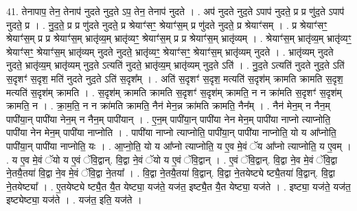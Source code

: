 \documentclass[17pt]{extarticle}
\begin{document}
41. तेनापाप॒ तेन॒ तेनाप॑ नुदते नुद॒ते ऽप॒ तेन॒ तेनाप॑ नुदते । . अप॑ नुदते नुद॒ते ऽपाप॑ नुदते॒ प्र प्र णु॑द॒ते ऽपाप॑ नुदते॒ प्र । . नु॒द॒ते॒ प्र प्र णु॑दते नुदते॒ प्र श्रेयाꣳ॑सꣳ॒॒ श्रेयाꣳ॑स॒म् प्र णु॑दते नुदते॒ प्र श्रेयाꣳ॑सम् । . प्र श्रेयाꣳ॑सꣳ॒॒ श्रेयाꣳ॑स॒म् प्र प्र श्रेयाꣳ॑स॒म् भ्रातृ॑व्य॒म् भ्रातृ॑व्यꣳ॒॒ श्रेयाꣳ॑स॒म् प्र प्र श्रेयाꣳ॑स॒म् भ्रातृ॑व्यम् । . श्रेयाꣳ॑स॒म् भ्रातृ॑व्य॒म् भ्रातृ॑व्यꣳ॒॒ श्रेयाꣳ॑सꣳ॒॒ श्रेयाꣳ॑स॒म् भ्रातृ॑व्यम् नुदते नुदते॒ भ्रातृ॑व्यꣳ॒॒ श्रेयाꣳ॑सꣳ॒॒ श्रेयाꣳ॑स॒म् भ्रातृ॑व्यम् नुदते । . भ्रातृ॑व्यम् नुदते नुदते॒ भ्रातृ॑व्य॒म् भ्रातृ॑व्यम् नुद॒ते ऽत्यति॑ नुदते॒ भ्रातृ॑व्य॒म् भ्रातृ॑व्यम् नुद॒ते ऽति॑ । . नु॒द॒ते ऽत्यति॑ नुदते नुद॒ते ऽति॑ स॒दृशꣳ॑ स॒दृश॒ मति॑ नुदते नुद॒ते ऽति॑ स॒दृश᳚म् । . अति॑ स॒दृशꣳ॑ स॒दृश॒ मत्यति॑ स॒दृश॑म् क्रामति क्रामति स॒दृश॒ मत्यति॑ स॒दृश॑म् क्रामति । . स॒दृश॑म् क्रामति क्रामति स॒दृशꣳ॑ स॒दृश॑म् क्रामति॒ न न क्रा॑मति स॒दृशꣳ॑ स॒दृश॑म् क्रामति॒ न । . क्रा॒म॒ति॒ न न क्रा॑मति क्रामति॒ नैन॑ मेन॒न्न क्रा॑मति क्रामति॒ नैन᳚म् । . नैन॑ मेन॒म् न नैन॒म् पापी॑या॒न् पापी॑या नेन॒म् न नैन॒म् पापी॑यान् । . ए॒न॒म् पापी॑या॒न् पापी॑या नेन मेन॒म् पापी॑या नाप्नो त्याप्नोति॒ पापी॑या नेन मेन॒म् पापी॑या नाप्नोति । . पापी॑या नाप्नो त्याप्नोति॒ पापी॑या॒न् पापी॑या नाप्नोति॒ यो य आ᳚प्नोति॒ पापी॑या॒न् पापी॑या नाप्नोति॒ यः । . आ॒प्नो॒ति॒ यो य आ᳚प्नो त्याप्नोति॒ य ए॒व मे॒वं ॅय आ᳚प्नो त्याप्नोति॒ य ए॒वम् । . य ए॒व मे॒वं ॅयो य ए॒वं ॅवि॒द्वान्. वि॒द्वा ने॒वं ॅयो य ए॒वं ॅवि॒द्वान् । . ए॒वं ॅवि॒द्वान्. वि॒द्वा ने॒व मे॒वं ॅवि॒द्वा ने॒तयै॒तया॑ वि॒द्वा ने॒व मे॒वं ॅवि॒द्वा ने॒तया᳚ । . वि॒द्वा ने॒तयै॒तया॑ वि॒द्वान्. वि॒द्वा ने॒तयेष्ट्ये ष्ट्यै॒तया॑ वि॒द्वान्. वि॒द्वा ने॒तयेष्ट्या᳚ । . ए॒तयेष्ट्ये ष्ट्यै॒त यै॒त येष्ट्या॒ यज॑ते॒ यज॑त॒ इष्ट्यै॒त यै॒त येष्ट्या॒ यज॑ते । . इष्ट्या॒ यज॑ते॒ यज॑त॒ इष्ट्येष्ट्या॒ यज॑ते । . यज॑त॒ इति॒ यज॑ते । \newline
\pagebreak
{}
\end{document}
